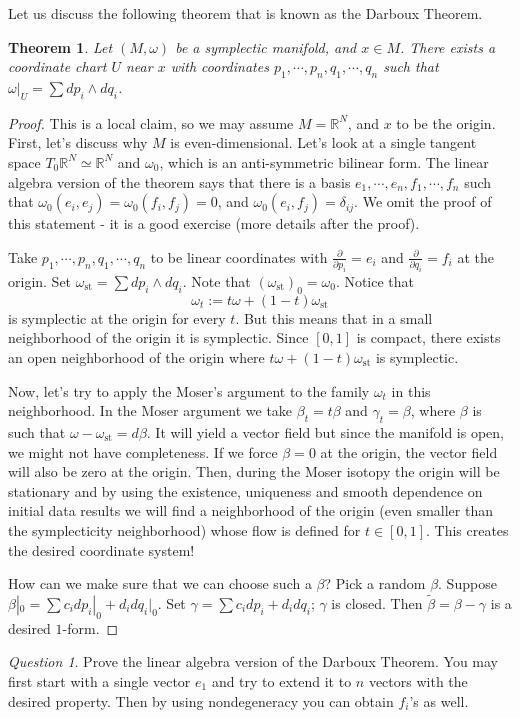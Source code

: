 \documentclass[12pt]{amsart}
\newtheorem{theorem}{Theorem}
\newcommand{\R}{\mathbb{R}} %
\theoremstyle{remark}
\newtheorem{question}{Question}
\begin{document}
Let us discuss the following theorem that is known as the Darboux Theorem. 
\begin{theorem}
Let $(M,\omega)$ be a symplectic manifold, and $x\in M$. There exists a coordinate chart $U$ near $x$ with coordinates $p_1,\cdots,p_n,q_1,\cdots,q_n$ such that $\omega|_U=\sum dp_i\wedge dq_i$.
\end{theorem}
\begin{proof}
This is a local claim, so we may assume $M=\R^N$, and $x$ to be the origin. First, let's discuss why $M$ is even-dimensional. Let's look at a single tangent space $T_0\R^N\simeq \R^N$ and $\omega_0$, which is an anti-symmetric bilinear form. The linear algebra version of the theorem says that there is a basis $e_1,\cdots,e_n,f_1,\cdots,f_n$ such that $\omega_0(e_i,e_j)=\omega_0(f_i,f_j)=0$, and $\omega_0(e_i,f_j)=\delta_{ij}$. We omit the proof of this statement - it is a good exercise (more details after the proof).

Take $p_1,\cdots,p_n,q_1,\cdots,q_n$ to be linear coordinates with $\frac{\partial}{\partial p_i}=e_i$ and $\frac{\partial}{\partial q_i}=f_i$ at the origin. Set $\omega_\text{st}=\sum dp_i\wedge dq_i$. Note that $(\omega_\text{st})_0=\omega_0$. Notice that $$\omega_t:=t\omega+(1-t)\omega_\text{st}$$ is symplectic at the origin for every $t$. But this means that in a small neighborhood of the origin it is symplectic. Since $\left[0,1\right]$ is compact, there exists an open neighborhood of the origin where $t\omega+(1-t)\omega_\text{st}$ is symplectic. 

Now, let's try to apply the Moser's argument to the family $\omega_t$ in this neighborhood. In the Moser argument we take $\beta_t=t\beta$ and $\gamma_t=\beta$, where $\beta$ is such that $\omega-\omega_\text{st}=d\beta$. It will yield a vector field but since the manifold is open, we might not have completeness. If we force $\beta=0$ at the origin, the vector field will also be zero at the origin. Then, during the Moser isotopy the origin will be stationary and by using the existence, uniqueness and smooth dependence on initial data results we will find a neighborhood of the origin (even smaller than the symplecticity neighborhood) whose flow is defined for $t\in [0,1]$. This creates the desired coordinate system! 

How can we make sure that we can choose such a $\beta$? Pick a random $\beta$. Suppose $\beta|_0=\sum c_idp_i|_0+d_idq_i|_0$. Set $\gamma=\sum c_idp_i+d_idq_i$; $\gamma$ is closed. Then $\tilde{\beta}=\beta-\gamma$ is a desired $1$-form. 
\end{proof}
\begin{question}
Prove the linear algebra version of the Darboux Theorem. You may first start with a single vector $e_1$ and try to extend it to $n$ vectors with the desired property. Then by using nondegeneracy you can obtain $f_i$'s as well.
\end{question}
\end{document}
